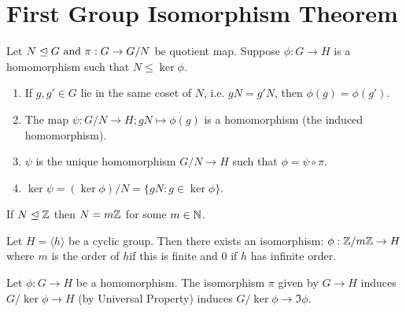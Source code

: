 \section{First Group Isomorphism Theorem}

\begin{theorem}
    Let \(N \trianglelefteq G \text{ and } \pi: G \to G / N\) be quotient map. Suppose \(\phi: G \to H\) is a homomorphism such that \(N \leq \ker \phi\).
    \begin{enumerate}
        \item If \(g, g' \in G\) lie in the same coset of \(N\), i.e. \(gN = g'N\), then \(\phi(g) = \phi(g')\).
        \item The map \(\psi: G / N \to H; gN \mapsto \phi(g)\) is a homomorphism (the induced homomorphism).
        \item \(\psi\) is the unique homomorphism \(G / N \to H\) such that \(\phi = \psi \circ \pi\).
        \item \(\ker \psi = (\ker \phi) / N = \{gN : g \in \ker \phi\}\).
    \end{enumerate}
\end{theorem}

\begin{lemma}
    If \(N \trianglelefteq \mathbb{Z}\) then \(N = m\mathbb{Z}\) for some \(m \in \mathbb{N}\).
\end{lemma}

\begin{proposition}
    Let \(H = \langle h \rangle\) be a cyclic group. Then there exists an isomorphism: \(\phi: \mathbb{Z} / m\mathbb{Z} \to H\) where \(m\) is the order of \(h\)if this is finite and 0 if \(h\) has infinite order.
\end{proposition}

\begin{theorem}
    Let \(\phi: G \to H\) be a homomorphism. The isomorphism \(\pi\) given by \(G \to H\) induces \(G / \ker \phi \to H\) (by Universal Property) induces \(G / \ker \phi \to \Im \phi\).
\end{theorem}